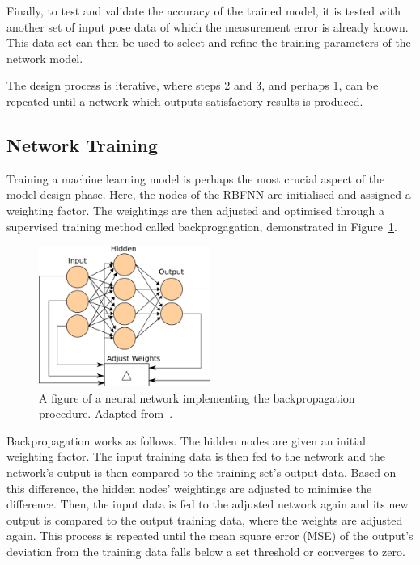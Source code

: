 Finally, to test and validate the accuracy of the trained model, it is tested with another set of input pose data of which the measurement error is already known. This data set can then be used to select and refine the training parameters of the network model. 

The design process is iterative, where steps 2 and 3, and perhaps 1, can be repeated until a network which outputs satisfactory results is produced. 

\subsection{Network Training}

Training a machine learning model is perhaps the most crucial aspect of the model design phase. Here, the nodes of the RBFNN are initialised and assigned a weighting factor. The weightings are then adjusted and optimised through a supervised training method called backprogagation, demonstrated in Figure~\ref{fig:chap4-backprogagation}.

\begin{figure}
  \centering
  \includegraphics[width=0.5\textwidth]{figures/chapter4/backpropagation}
  \caption[A neural network implementing the backpropagation procedure.]{A figure of a neural network implementing the backpropagation procedure. Adapted from~\cite{ann-wiki-pic}.}
\label{fig:chap4-backprogagation}
\end{figure}

Backpropagation works as follows. The hidden nodes are given an initial weighting factor. The input training data is then fed to the network and the network's output is then compared to the training set's output data. Based on this difference, the hidden nodes' weightings are adjusted to minimise the difference. Then, the input data is fed to the adjusted network again and its new output is compared to the output training data, where the weights are adjusted again. This process is repeated until the mean square error (MSE) of the output's deviation from the training data falls below a set threshold or converges to zero. 

